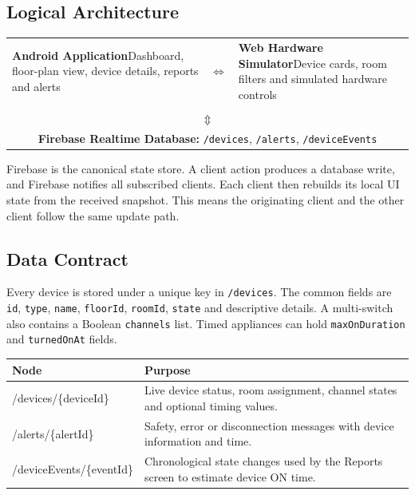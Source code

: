 \documentclass[11pt,a4paper]{article}
\begin{document}
\subsection{Logical Architecture}
\begin{center}
\begin{tabular}{p{} c p{}}
\centering\cellcolor{lightblue}\textbf{Android Application}\newline\small Dashboard, floor-plan view, device details, reports and alerts
& $\Longleftrightarrow$ &
\centering\cellcolor{lightblue}\textbf{Web Hardware Simulator}\newline\small Device cards, room filters and simulated hardware controls \\
& \multicolumn{1}{c}{} & \\
\multicolumn{3}{c}{\Large$\Updownarrow$} \\
\multicolumn{3}{c}{\cellcolor{lightblue}\textbf{Firebase Realtime Database:} \texttt{/devices}, \texttt{/alerts}, \texttt{/deviceEvents}} \\
\end{tabular}
\end{center}

Firebase is the canonical state store. A client action produces a database write, and Firebase notifies all subscribed clients. Each client then rebuilds its local UI state from the received snapshot. This means the originating client and the other client follow the same update path.

\subsection{Data Contract}
Every device is stored under a unique key in \texttt{/devices}. The common fields are \texttt{id}, \texttt{type}, \texttt{name}, \texttt{floorId}, \texttt{roomId}, \texttt{state} and descriptive details. A multi-switch also contains a Boolean \texttt{channels} list. Timed appliances can hold \texttt{maxOnDuration} and \texttt{turnedOnAt} fields.

\begin{tabularx}{\textwidth}{>{\ttfamily}p{3.1cm}X}
\toprule
Node & Purpose \\
\midrule
/devices/\{deviceId\} & Live device status, room assignment, channel states and optional timing values. \\
/alerts/\{alertId\} & Safety, error or disconnection messages with device information and time. \\
/deviceEvents/\{eventId\} & Chronological state changes used by the Reports screen to estimate device ON time. \\
\bottomrule
\end{tabularx}
\end{document}
